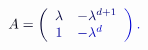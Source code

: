 \documentclass[12pt]{article}
\begin{document}
\makeatletter
\renewcommand*{\@textcolor}[3]{%
  \protect\leavevmode
  \begingroup
    \color#1{#2}#3%
  \endgroup
}
\makeatother
\begin{displaymath}
\mathcolor[RGB]{0,0,15}{A} \mathcolor[RGB]{0,0,30}{=} \mathcolor[RGB]{0,0,45}{\left(} \begin{array} {cl} { \mathcolor[RGB]{0,0,60}{\lambda} } & { \mathcolor[RGB]{0,0,75}{-} \mathcolor[RGB]{0,0,90}{\lambda} ^ { \mathcolor[RGB]{0,0,105}{d} \mathcolor[RGB]{0,0,120}{+} \mathcolor[RGB]{0,0,135}{1} } } \\ { \mathcolor[RGB]{0,0,150}{1} } & { \mathcolor[RGB]{0,0,165}{-} \mathcolor[RGB]{0,0,180}{\lambda} ^ { \mathcolor[RGB]{0,0,195}{d} } } \end{array} \mathcolor[RGB]{0,0,210}{\right)} \mathcolor[RGB]{0,0,225}{.}
\end{displaymath}
\end{document}
